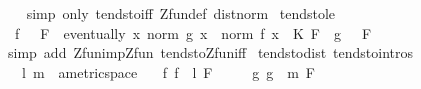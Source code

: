 \begin{isabellebody}
%
\isadelimproof
\ \ %
\endisadelimproof
%
\isatagproof
{}\isamarkupfalse%
\ {\isacharparenleft}{\kern0pt}simp\ only{\isacharcolon}{\kern0pt}\ tendsto{\isacharunderscore}{\kern0pt}iff\ Zfun{\isacharunderscore}{\kern0pt}def\ dist{\isacharunderscore}{\kern0pt}norm{\isacharparenright}{\kern0pt}%
\endisatagproof
{\isafoldproof}%
%
\isadelimproof
\isanewline
%
\endisadelimproof
\isanewline
{}\isamarkupfalse%
\ tendsto{\isacharunderscore}{\kern0pt}{}{\isacharunderscore}{\kern0pt}le{\isacharcolon}{\kern0pt}\isanewline
\ \ {\isachardoublequoteopen}{\isacharparenleft}{\kern0pt}f\ {\isasymlonglongrightarrow}\ {}{\isacharparenright}{\kern0pt}\ F\ {\isasymLongrightarrow}\ eventually\ {\isacharparenleft}{\kern0pt}{\isasymlambda}x{\isachardot}{\kern0pt}\ norm\ {\isacharparenleft}{\kern0pt}g\ x{\isacharparenright}{\kern0pt}\ {\isasymle}\ norm\ {\isacharparenleft}{\kern0pt}f\ x{\isacharparenright}{\kern0pt}\ {\isacharasterisk}{\kern0pt}\ K{\isacharparenright}{\kern0pt}\ F\ {\isasymLongrightarrow}\ {\isacharparenleft}{\kern0pt}g\ {\isasymlonglongrightarrow}\ {}{\isacharparenright}{\kern0pt}\ F{\isachardoublequoteclose}\isanewline
%
\isadelimproof
\ \ %
\endisadelimproof
%
\isatagproof
{}\isamarkupfalse%
\ {\isacharparenleft}{\kern0pt}simp\ add{\isacharcolon}{\kern0pt}\ Zfun{\isacharunderscore}{\kern0pt}imp{\isacharunderscore}{\kern0pt}Zfun\ tendsto{\isacharunderscore}{\kern0pt}Zfun{\isacharunderscore}{\kern0pt}iff{\isacharparenright}{\kern0pt}%
\endisatagproof
{\isafoldproof}%
%
\isadelimproof
%
\endisadelimproof
%
\isadelimdocument
%
\endisadelimdocument
%
\isatagdocument
%
\isamarkuptrue%
%
\endisatagdocument
{\isafolddocument}%
%
\isadelimdocument
%
\endisadelimdocument
{}\isamarkupfalse%
\ tendsto{\isacharunderscore}{\kern0pt}dist\ {\isacharbrackleft}{\kern0pt}tendsto{\isacharunderscore}{\kern0pt}intros{\isacharbrackright}{\kern0pt}{\isacharcolon}{\kern0pt}\isanewline
\ \ \ l\ m\ {\isacharcolon}{\kern0pt}{\isacharcolon}{\kern0pt}\ {\isachardoublequoteopen}{\isacharprime}{\kern0pt}a{\isacharcolon}{\kern0pt}{\isacharcolon}{\kern0pt}metric{\isacharunderscore}{\kern0pt}space{\isachardoublequoteclose}\isanewline
\ \ \ f{\isacharcolon}{\kern0pt}\ {\isachardoublequoteopen}{\isacharparenleft}{\kern0pt}f\ {\isasymlonglongrightarrow}\ l{\isacharparenright}{\kern0pt}\ F{\isachardoublequoteclose}\isanewline
\ \ \ \ \ g{\isacharcolon}{\kern0pt}\ {\isachardoublequoteopen}{\isacharparenleft}{\kern0pt}g\ {\isasymlonglongrightarrow}\ m{\isacharparenright}{\kern0pt}\ F{\isachardoublequoteclose}\isanewline

\end{isabellebody}

